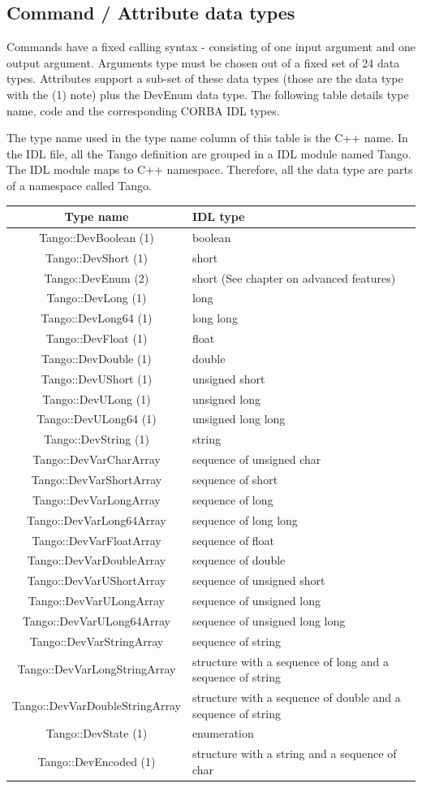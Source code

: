 \subsection{Command / Attribute data types}

Commands have a fixed calling syntax - consisting of one input argument
and one output argument. Arguments type must be chosen out of a fixed
set of 24 data types. Attributes support a sub-set of these data types
(those are the data type with the (1) note) plus the DevEnum data
type. The following table details type name, code and the corresponding
CORBA IDL types.

The type name used in the type name column of this table is the C++
name. In the IDL file, all the Tango definition are grouped in a IDL
module named Tango. The IDL module maps to C++ namespace.
Therefore, all the data type are parts of a namespace called Tango.

\vspace{0.3cm}


\begin{center}
\begin{longtable}{|c|l|}
\hline 
Type name & IDL type\tabularnewline
\hline 
\hline 
Tango::DevBoolean (1) & boolean\tabularnewline
\hline 
Tango::DevShort (1) & short\tabularnewline
\hline 
Tango::DevEnum (2) & short (See chapter on advanced features)\tabularnewline
\hline 
Tango::DevLong (1) & long\tabularnewline
\hline 
Tango::DevLong64 (1) & long long\tabularnewline
\hline 
Tango::DevFloat (1) & float\tabularnewline
\hline 
Tango::DevDouble (1) & double\tabularnewline
\hline 
Tango::DevUShort (1) & unsigned short\tabularnewline
\hline 
Tango::DevULong (1) & unsigned long\tabularnewline
\hline 
Tango::DevULong64 (1) & unsigned long long\tabularnewline
\hline 
Tango::DevString (1) & string\tabularnewline
\hline 
Tango::DevVarCharArray & sequence of unsigned char\tabularnewline
\hline 
Tango::DevVarShortArray & sequence of short\tabularnewline
\hline 
Tango::DevVarLongArray & sequence of long\tabularnewline
\hline 
Tango::DevVarLong64Array & sequence of long long\tabularnewline
\hline 
Tango::DevVarFloatArray & sequence of float\tabularnewline
\hline 
Tango::DevVarDoubleArray & sequence of double\tabularnewline
\hline 
Tango::DevVarUShortArray & sequence of unsigned short\tabularnewline
\hline 
Tango::DevVarULongArray & sequence of unsigned long\tabularnewline
\hline 
Tango::DevVarULong64Array & sequence of unsigned long long\tabularnewline
\hline 
Tango::DevVarStringArray & sequence of string\tabularnewline
\hline 
Tango::DevVarLongStringArray & structure with a sequence of long and a sequence of string\tabularnewline
\hline 
Tango::DevVarDoubleStringArray & structure with a sequence of double and a sequence of string\tabularnewline
\hline 
Tango::DevState (1) & enumeration\tabularnewline
\hline 
Tango::DevEncoded (1) & structure with a string and a sequence of char\tabularnewline
\hline 
\end{longtable}
\par\end{center}

